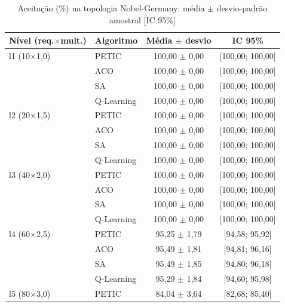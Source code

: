 \begin{table}[htb]
    \centering
    \small
    \caption{Aceitação (\%) na topologia Nobel-Germany: média $\pm$ desvio-padrão amostral [IC 95\%]}
    \label{tab:aceitacao-nobel-germany}
    \begin{tabular}{llcc}
        \hline
        Nível (req.$\times$mult.) & Algoritmo & Média $\pm$ desvio & IC 95\% \\
        \hline
        l1 (10$\times$1,0) & PETIC & 100,00 $\pm$ 0,00 & [100,00; 100,00] \\
         & ACO & 100,00 $\pm$ 0,00 & [100,00; 100,00] \\
         & SA & 100,00 $\pm$ 0,00 & [100,00; 100,00] \\
         & Q-Learning & 100,00 $\pm$ 0,00 & [100,00; 100,00] \\
        \hline
        l2 (20$\times$1,5) & PETIC & 100,00 $\pm$ 0,00 & [100,00; 100,00] \\
         & ACO & 100,00 $\pm$ 0,00 & [100,00; 100,00] \\
         & SA & 100,00 $\pm$ 0,00 & [100,00; 100,00] \\
         & Q-Learning & 100,00 $\pm$ 0,00 & [100,00; 100,00] \\
        \hline
        l3 (40$\times$2,0) & PETIC & 100,00 $\pm$ 0,00 & [100,00; 100,00] \\
         & ACO & 100,00 $\pm$ 0,00 & [100,00; 100,00] \\
         & SA & 100,00 $\pm$ 0,00 & [100,00; 100,00] \\
         & Q-Learning & 100,00 $\pm$ 0,00 & [100,00; 100,00] \\
        \hline
        l4 (60$\times$2,5) & PETIC & 95,25 $\pm$ 1,79 & [94,58; 95,92] \\
         & ACO & 95,49 $\pm$ 1,81 & [94,81; 96,16] \\
         & SA & 95,49 $\pm$ 1,85 & [94,80; 96,18] \\
         & Q-Learning & 95,29 $\pm$ 1,84 & [94,60; 95,98] \\
        \hline
        l5 (80$\times$3,0) & PETIC & 84,04 $\pm$ 3,64 & [82,68; 85,40] \\

\end{tabular}
\end{table}
